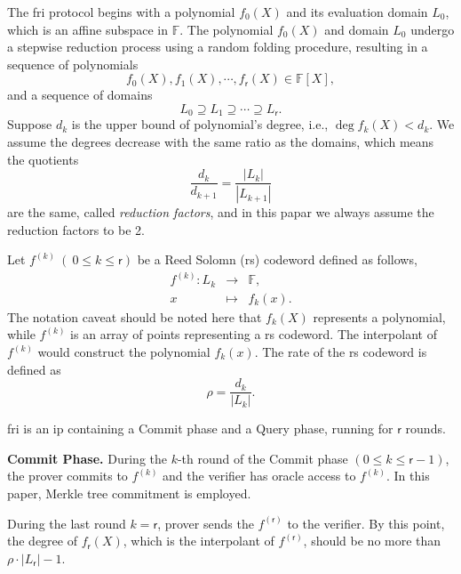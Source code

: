 The \gls{fri} protocol begins with a polynomial $f_0(X)$ and its evaluation domain $L_0$, which is an affine subspace in $\mathbb{F}$.
The polynomial $f_0(X)$ and domain $L_0$ undergo a stepwise reduction process using a random folding procedure, resulting in a sequence of polynomials
\begin{equation}
	f_0(X), f_1(X),\cdots, f_{\mathsf{r}}(X)\in \mathbb{F}[X],
\end{equation}
and a sequence of domains
\begin{equation}
	L_0 \supseteq L_1 \supseteq \cdots \supseteq L_{\mathsf{r}}.
\end{equation}
Suppose $d_k$ is the upper bound of polynomial's degree, i.e., $\deg f_k(X) < d_k$. We assume the degrees decrease with the same ratio as the domains, which means the quotients
\begin{equation}
	\frac{d_k}{d_{k+1}} = \frac{|L_k|}{|L_{k+1}|}
\end{equation}
are the same, called \textit{reduction factors}, and in this papar we always assume the reduction factors to be 2.

Let $f^{(k)}\ (\ 0\le k \le \mathsf{r})$ be a Reed Solomn (\gls{rs}) codeword defined as follows,
\begin{equation}
	\begin{aligned}
		f^{(k)}:L_k &\rightarrow &\mathbb{F},\\
		x &\mapsto& f_k(x).
	\end{aligned}
\end{equation}
The notation caveat should be noted here that $f_k(X)$ represents a polynomial, while $f^{(k)}$ is an array of points representing a \gls{rs} codeword. The interpolant of $f^{(k)}$ would construct the polynomial $f_k(x)$. The rate of the \gls{rs} codeword is defined as
\begin{equation}
	\rho = \frac{d_k }{|L_{k}|}.
\end{equation}

\gls{fri} is an \gls{ip} containing a Commit phase and a Query phase,  running for $\mathsf{r}$ rounds.
\newline

\noindent\textbf{Commit Phase.}
During the $k$-th round of the Commit phase $(0\le k \le \mathsf{r} - 1)$, the prover commits to $f^{(k)}$ and the verifier has oracle access to  $f^{(k)}$. In this paper, Merkle tree commitment is employed.

During the last round $k = \mathsf{r}$, prover sends the  $f^{(\mathsf{r})}$ to the verifier. By this point, the degree of $f_{\mathsf{r}}(X)$, which is the interpolant of  $f^{(\mathsf{r})}$, should be no more than $\rho\cdot |L_{\mathsf{r}}| -1$.
\newline

